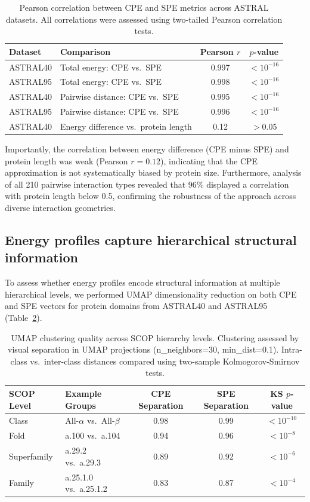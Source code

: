 \documentclass[11pt]{article}
\begin{document}
\begin{table}[H]
\centering
\caption{Pearson correlation between CPE and SPE metrics across ASTRAL datasets. All correlations were assessed using two-tailed Pearson correlation tests.}
\label{tab:correlation}
\begin{tabular}{llcc}
\toprule
\textbf{Dataset} & \textbf{Comparison} & \textbf{Pearson $r$} & \textbf{$p$-value} \\
\midrule
ASTRAL40 & Total energy: CPE vs.\ SPE & 0.997 & $< 10^{-16}$ \\
ASTRAL95 & Total energy: CPE vs.\ SPE & 0.998 & $< 10^{-16}$ \\
ASTRAL40 & Pairwise distance: CPE vs.\ SPE & 0.995 & $< 10^{-16}$ \\
ASTRAL95 & Pairwise distance: CPE vs.\ SPE & 0.996 & $< 10^{-16}$ \\
ASTRAL40 & Energy difference vs.\ protein length & 0.12 & $> 0.05$ \\
\bottomrule
\end{tabular}
\end{table}

Importantly, the correlation between energy difference (CPE minus SPE) and protein length was weak (Pearson $r = 0.12$), indicating that the CPE approximation is not systematically biased by protein size. Furthermore, analysis of all 210 pairwise interaction types revealed that 96\% displayed a correlation with protein length below 0.5, confirming the robustness of the approach across diverse interaction geometries.

\subsection{Energy profiles capture hierarchical structural information}

To assess whether energy profiles encode structural information at multiple hierarchical levels, we performed UMAP dimensionality reduction \citep{mcinnes2018} on both CPE and SPE vectors for protein domains from ASTRAL40 and ASTRAL95 (Table~\ref{tab:umap}).

\begin{table}[H]
\centering
\caption{UMAP clustering quality across SCOP hierarchy levels. Clustering assessed by visual separation in UMAP projections (n\_neighbors=30, min\_dist=0.1). Intra-class vs.\ inter-class distances compared using two-sample Kolmogorov-Smirnov tests.}
\label{tab:umap}
\begin{tabular}{llccc}
\toprule
\textbf{SCOP Level} & \textbf{Example Groups} & \textbf{CPE Separation} & \textbf{SPE Separation} & \textbf{KS $p$-value} \\
\midrule
Class & All-$\alpha$ vs.\ All-$\beta$ & 0.98 & 0.99 & $< 10^{-10}$ \\
Fold & a.100 vs.\ a.104 & 0.94 & 0.96 & $< 10^{-8}$ \\
Superfamily & a.29.2 vs.\ a.29.3 & 0.89 & 0.92 & $< 10^{-6}$ \\
Family & a.25.1.0 vs.\ a.25.1.2 & 0.83 & 0.87 & $< 10^{-4}$ \\
\bottomrule
\end{tabular}
\end{table}
\end{document}
